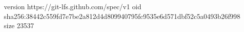 version https://git-lfs.github.com/spec/v1
oid sha256:38442c559fd7e7be2a812d4d809940795fc9535e6d571dbf52c5a0493b26f998
size 23537

